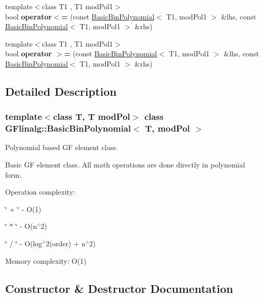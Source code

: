 \begin{DoxyCompactItemize}
\mbox{\label{class_g_flinalg_1_1_basic_bin_polynomial_a34108fe9ada40a1fd51ceca914fafba1}} 
{\footnotesize template$<$class T1 , T1 mod\+Pol1$>$ }\\bool {\bfseries operator$<$=} (const \mbox{\hyperlink{class_g_flinalg_1_1_basic_bin_polynomial}{Basic\+Bin\+Polynomial}}$<$ T1, mod\+Pol1 $>$ \&lhs, const \mbox{\hyperlink{class_g_flinalg_1_1_basic_bin_polynomial}{Basic\+Bin\+Polynomial}}$<$ T1, mod\+Pol1 $>$ \&rhs)
\item 
\mbox{\label{class_g_flinalg_1_1_basic_bin_polynomial_a4e4069f61370aeb941251559f984de33}} 
{\footnotesize template$<$class T1 , T1 mod\+Pol1$>$ }\\bool {\bfseries operator $>$=} (const \mbox{\hyperlink{class_g_flinalg_1_1_basic_bin_polynomial}{Basic\+Bin\+Polynomial}}$<$ T1, mod\+Pol1 $>$ \&lhs, const \mbox{\hyperlink{class_g_flinalg_1_1_basic_bin_polynomial}{Basic\+Bin\+Polynomial}}$<$ T1, mod\+Pol1 $>$ \&rhs)
\end{DoxyCompactItemize}


\subsection{Detailed Description}
\subsubsection*{template$<$class T, T mod\+Pol$>$\newline
class G\+Flinalg\+::\+Basic\+Bin\+Polynomial$<$ T, mod\+Pol $>$}

Polynomial based GF element class. 

Basic GF element class. All math operations are done directly in polynomial form.

Operation complexity\+:
\begin{DoxyItemize}
\item \char`\"{} + \char`\"{} -\/ O(1)
\item \char`\"{} $\ast$ \char`\"{} -\/ O(n$^\wedge$2)
\item \char`\"{} / \char`\"{} -\/ O(log$^\wedge$2(order) + n$^\wedge$2)
\end{DoxyItemize}

Memory complexity\+: O(1) 

\subsection{Constructor \& Destructor Documentation}
\mbox{\label{class_g_flinalg_1_1_basic_bin_polynomial_abe29be6adbd2e8cac7d0700008f25f3f}} 
